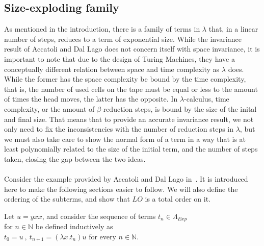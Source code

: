 \message{ !name(VU-CS-BSc-thesis-template.tex)}\documentclass[11pt]{article}
\begin{document}
\subsection{Size-exploding family}
As mentioned in the introduction, there is a family of terms in $\lambda$ that, in a linear number of steps, reduces to a term of exponential size. While the invariance result of Accatoli and Dal Lago does not concern itself with space invariance, it is important to note that due to the design of Turing Machines, they have a conceptually different relation between space and time complexity as $\lambda$ does. While the former has the space complexity be bound by the time complexity, that is, the number of used cells on the tape must be equal or less to the amount of times the head moves, the latter has the opposite. In $\lambda$-calculus, time complexity, or the amount of $\beta$-reduction steps, is bound by the size of the inital and final size. That means that to provide an accurate invariance result, we not only need to fix the inconsistencies with the number of reduction steps in $\lambda$, but we must also take care to show the normal form of a term in a way that is at least polynomially related to the size of the initial term, and the number of steps taken, closing the gap between the two ideas.
\\ \\
Consider the example provided by Accatoli and Dal Lago in~\cite{beta-invariance}. It is introduced here to make the following sections easier to follow. We will also define the ordering of the subterms, and show that $LO$ is a total order on it.
\begin{center}
  Let $u = yxx$, and consider the sequence of terms $t_{n} \in \Lambda_{Exp}$  \\ for $n \in \mathbb{N}$ be defined inductively as \\
  $t_{0} = u \ , \ t_{n + 1} = (\lambda x.t_{n})u$ for every $n \in \mathbb{N}$.
\end{center}
\end{document}

